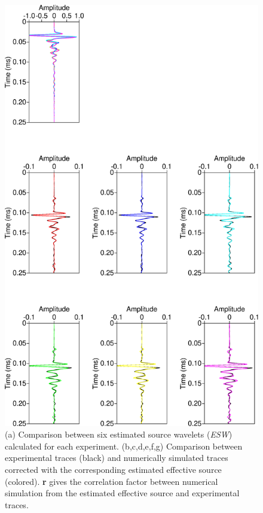 \documentclass[manuscript,revised]{geophysics}
\begin{document}
\begin{figure}[!h]
	\centering
	\includegraphics[scale=0.4]{fig/panel_srcest_2d.eps}
	\caption{(a) Comparison between six estimated source wavelets (\textit{ESW}) calculated for each experiment. (b,c,d,e,f,g) Comparison between experimental traces (black) and numerically simulated traces corrected with the corresponding estimated effective source (colored). \textbf{r} gives the correlation factor between numerical simulation from the estimated effective source and experimental traces.}
	\label{panel_srcest_2d}
\end{figure}
\end{document}
